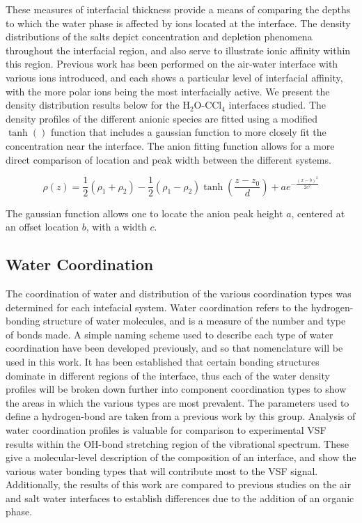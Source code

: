 These measures of interfacial thickness provide a means of comparing the depths to which the water phase is affected by ions located at the interface. The density distributions of the salts depict concentration and depletion phenomena throughout the interfacial region, and also serve to illustrate ionic affinity within this region. Previous work has been performed on the air-water interface with various ions introduced, and each shows a particular level of interfacial affinity, with the more polar ions being the most interfacially active. We present the density distribution results below for the H$_2$O-CCl$_4$ interfaces studied. The density profiles of the different anionic species are fitted using a modified $\tanh()$ function that includes a gaussian function to more closely fit the concentration near the interface. The anion fitting function allows for a more direct comparison of location and peak width between the different systems.

\begin{equation}\label{ion_fit}
	\rho(z) = \frac12(\rho_1+\rho_2) - \frac12\left(\rho_1-\rho_2\right)\tanh\left(\frac{z-z_0}{d}\right) + ae^{-\frac{(x-b)^2}{2c^2}}
\end{equation}

The gaussian function allows one to locate the anion peak height $a$, centered at an offset location $b$, with a width $c$.

\subsection{Water Coordination}
The coordination of water and distribution of the various coordination types was determined for each intefacial system. Water coordination refers to the hydrogen-bonding structure of water molecules, and is a measure of the number and type of bonds made. A simple naming scheme used to describe each type of water coordination have been developed previously,\cite{Walker2006b} and so that nomenclature will be used in this work. It has been established that certain bonding structures dominate in different regions of the interface, thus each of the water density profiles will be broken down further into component coordination types to show the areas in which the various types are most prevalent. The parameters used to define a hydrogen-bond are taken from a previous work by this group.\cite{Walker2006b} Analysis of water coordination profiles is valuable for comparison to experimental VSF results within the OH-bond stretching region of the vibrational spectrum. These give a molecular-level description of the composition of an interface, and show the various water bonding types that will contribute most to the VSF signal. Additionally, the results of this work are compared to previous studies on the air and salt water interfaces to establish differences due to the addition of an organic phase.

